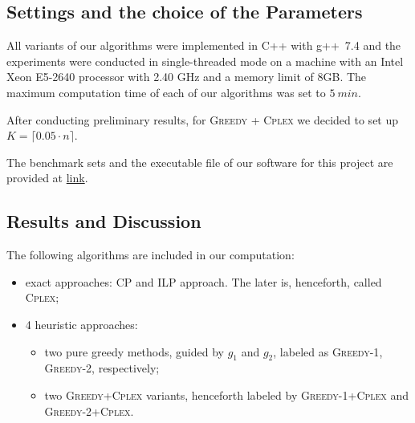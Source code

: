 \documentclass[runningheads,a4paper]{elsarticle}
\begin{document}
     \subsection{Settings and the choice of the Parameters}
      All variants of our algorithms were implemented in C++ with g++~7.4 and the experiments were conducted in single-threaded mode on a machine with an Intel Xeon E5-2640 processor with 2.40 GHz and a memory limit of 8GB. The maximum computation time of each of our algorithms was set to $5\ min$.

      After conducting preliminary results, for
        \textsc{Greedy + \textsc{Cplex}} we decided to set up $K = \lceil 0.05 \cdot n \rceil$.

     The benchmark sets and the executable file of our software for this project are provided at \href{link}{link}.
	\subsection{Results and Discussion}
        The following algorithms are included in our computation:
        \begin{itemize}
        	\item  exact approaches: CP and ILP approach. The later is, henceforth, called \textsc{Cplex};
            \item 4 heuristic approaches:
           \begin{itemize}
           	\item two pure greedy methods, guided by $g_1$ and $g_2$, labeled as \textsc{Greedy-1}, \textsc{Greedy-2}, respectively;
            \item two \textsc{Greedy+Cplex} variants, henceforth labeled by  \textsc{Greedy-1}+\textsc{Cplex} and
            \textsc{Greedy-2}+\textsc{Cplex}.
        \end{itemize}
    \end{itemize}
\end{document}
